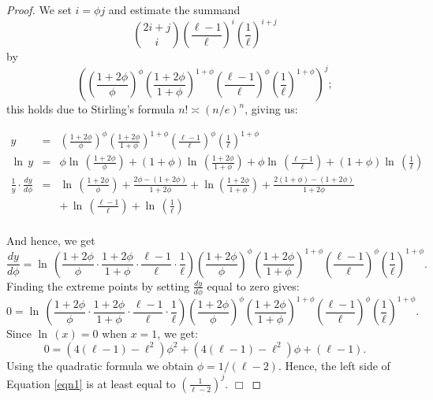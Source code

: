 \begin{proof} We set $i = \phi j$ and estimate the summand \[ {{2i + j}\choose{i}} \left( \frac{\ell - 1}{\ell}\right)^{i} \left( \frac{1}{\ell}\right)^{i + j} \] by \[ \left( \left( \frac{1 + 2\phi}{\phi} \right)^{\phi}  \left( \frac{1 + 2\phi}{1 + \phi} \right)^{1 + \phi}  \left( \frac{\ell - 1}{\ell}\right)^{\phi} \left( \frac{1}{\ell}\right)^{1 + \phi} \right)^j; \] this holds due to Stirling's formula $n! \asymp (n/e)^n$, giving us:

\begin{eqnarray*}
y 	&  = & \left( \frac{1 + 2\phi}{\phi} \right)^{\phi}  \left( \frac{1 + 2\phi}{1 + \phi} \right)^{1 + \phi}  \left( \frac{\ell - 1}{\ell}\right)^{\phi} \left( \frac{1}{\ell}\right)^{1 + \phi} \\
\ln \, y	&  = & \phi \ln \, \left( \frac{1 + 2\phi}{\phi} \right) + (1 + \phi) \ln \, \left( \frac{1 + 2\phi}{1 + \phi} \right) + \phi \ln \, \left( \frac{\ell - 1}{\ell}\right) + (1 + \phi) \ln \, \left( \frac{1}{\ell}\right) \\
\frac{1}{y} \cdot \frac{dy}{d \phi}	&  = & \ln \, \left( \frac{1 + 2\phi}{\phi} \right) + \frac{2\phi - (1 + 2\phi)}{1 + 2\phi} + \ln \left(\frac{1 + 2\phi}{1 + \phi} \right) + \frac{2(1 + \phi) - (1 + 2\phi)}{1 + 2\phi} \\
&~& +  \, \ln \, \left( \frac{\ell - 1}{\ell}\right) +  \ln \, \left( \frac{1}{\ell}\right) \\
\end{eqnarray*} 

And hence, we get $$\frac{dy}{d\phi}	 =  \ln \, \left( \frac{1 + 2\phi}{\phi}  \cdot \frac{1 + 2\phi}{1 + \phi} \cdot \frac{\ell - 1}{\ell} \cdot \frac{1}{\ell}\right) \left( \frac{1 + 2\phi}{\phi} \right)^{\phi}  \left( \frac{1 + 2\phi}{1 + \phi} \right)^{1 + \phi}  \left( \frac{\ell - 1}{\ell}\right)^{\phi} \left( \frac{1}{\ell}\right)^{1 + \phi}.$$ Finding the extreme points by setting $\frac{dy}{d\phi}$ equal to zero gives: $$0	 =  \ln \, \left( \frac{1 + 2\phi}{\phi}  \cdot \frac{1 + 2\phi}{1 + \phi} \cdot \frac{\ell - 1}{\ell} \cdot \frac{1}{\ell}\right) \left( \frac{1 + 2\phi}{\phi} \right)^{\phi}  \left( \frac{1 + 2\phi}{1 + \phi} \right)^{1 + \phi}  \left( \frac{\ell - 1}{\ell}\right)^{\phi} \left( \frac{1}{\ell}\right)^{1 + \phi}.$$ Since $\ln \, (x) =  0$ when $x = 1$, we get:$$0  = (4 (\ell - 1) - \ell^2)\phi^2 +  (4 (\ell - 1) - \ell^2)\phi + (\ell - 1).$$ Using the quadratic formula we obtain $\phi  = 1/(\ell - 2)$. Hence, the left side of Equation \ref{eqn1} is at least equal to $\left(\frac{1}{\ell - 2} \right)^j.$ \hfill $\Box$ \end{proof}

